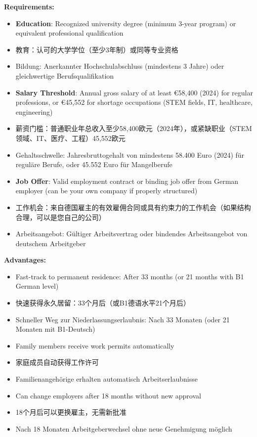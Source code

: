 \textbf{Requirements:}
\begin{itemize}
    \item \textbf{Education}: Recognized university degree (minimum 3-year program) or equivalent professional qualification
    \item 教育：认可的大学学位（至少3年制）或同等专业资格
    \item Bildung: Anerkannter Hochschulabschluss (mindestens 3 Jahre) oder gleichwertige Berufsqualifikation
    
    \item \textbf{Salary Threshold}: Annual gross salary of at least €58,400 (2024) for regular professions, or €45,552 for shortage occupations (STEM fields, IT, healthcare, engineering)
    \item 薪资门槛：普通职业年总收入至少58,400欧元（2024年），或紧缺职业（STEM领域、IT、医疗、工程）45,552欧元
    \item Gehaltsschwelle: Jahresbruttogehalt von mindestens 58.400 Euro (2024) für reguläre Berufe, oder 45.552 Euro für Mangelberufe
    
    \item \textbf{Job Offer}: Valid employment contract or binding job offer from German employer (can be your own company if properly structured)
    \item 工作机会：来自德国雇主的有效雇佣合同或具有约束力的工作机会（如果结构合理，可以是您自己的公司）
    \item Arbeitsangebot: Gültiger Arbeitsvertrag oder bindendes Arbeitsangebot von deutschem Arbeitgeber
\end{itemize}

\textbf{Advantages:}
\begin{itemize}
    \item Fast-track to permanent residence: After 33 months (or 21 months with B1 German level)
    \item 快速获得永久居留：33个月后（或B1德语水平21个月后）
    \item Schneller Weg zur Niederlassungserlaubnis: Nach 33 Monaten (oder 21 Monaten mit B1-Deutsch)
    \item Family members receive work permits automatically
    \item 家庭成员自动获得工作许可
    \item Familienangehörige erhalten automatisch Arbeitserlaubnisse
    \item Can change employers after 18 months without new approval
    \item 18个月后可以更换雇主，无需新批准
    \item Nach 18 Monaten Arbeitgeberwechsel ohne neue Genehmigung möglich
\end{itemize}

